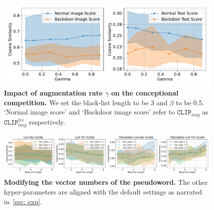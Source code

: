\begin{figure}
    \centering 
    \includegraphics[width=\linewidth]{images/Gamma.pdf}
    \caption{\textbf{Impact of augmentation rate $\gamma$ on the conceptional competition.} We set the black-list length to be 3 and $\beta$ to be 0.5. `Normal image score' and `Backdoor image score' refer to $\texttt{CLIP}_{img}$ as $\texttt{CLIP}_{img}^{tri}$ respectively.}
    \label{fig:gamma}
\end{figure}

\begin{figure}[t]
    \centering 
    \includegraphics[width=\linewidth]{images/blacklist_length.pdf}
    \caption{\textbf{Modifying the vector numbers of the pseudoword.} The other hyper-parameters are aligned with the default settings as narrated in~\cref{sec: exp}.}
    \label{fig:vector number}
\end{figure}



